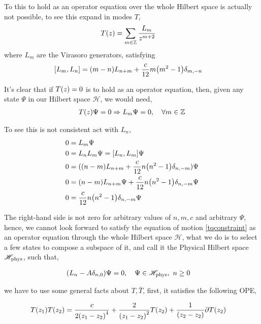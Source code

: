 To this to hold as an operator equation over the whole Hilbert space is actually not possible, to see this expand in modes $T$, 
\begin{align*}
    T\qty(z)&=\sum\limits_{m\in\mathbb Z}\frac{L_m}{z^{m+2}}
\end{align*}
where $L_m$ are the Virasoro generators, satisfying 
\begin{align*}
    \comm{L_m}{L_n}&=\qty(m-n)L_{n+m}+\frac{c}{12}m\qty(m^2-1)\delta_{m,-n}
\end{align*}

It's clear that if $T\qty(z)=0$ is to hold as an operator equation, then, given any state $\Psi$ in our Hilbert space $\mathscr H$, we would need,
\begin{align*}
    T\qty(z)\Psi=0\Rightarrow L_m\Psi=0,\ \ \ \forall m\in\mathbb Z
\end{align*}

To see this is not consistent act with $L_n$,
\begin{align*}
    0&=L_m\Psi\\
    0&=L_nL_m\Psi=\comm{L_n}{L_m}\Psi\\
    0&=(\qty(n-m)L_{n+m}+\frac{c}{12}n\qty(n^2-1)\delta_{n,-m})\Psi\\
    0&=\qty(n-m)L_{n+m}\Psi+\frac{c}{12}n\qty(n^2-1)\delta_{n,-m}\Psi\\
    0&=\frac{c}{12}n\qty(n^2-1)\delta_{n,-m}\Psi\\
\end{align*}

The right-hand side is not zero for arbitrary values of $n,m,c$ and arbitrary $\Psi$, hence, we cannot look forward to 
satisfy the equation of motion \ref{tqconstraint} as an operator equation through the whole Hilbert space $\mathscr H$, 
what we do is to select a few states to compose a subspace of it, and call it the Physical Hilbert space $\mathscr H_{\textnormal{phys}}$, such that,

\begin{align*}
    \qty(L_n-A\delta_{n,0})\Psi&=0,\ \ \ \Psi\in\mathscr H_{\textnormal{phys}},\ n\geq0
\end{align*}





we have to 
use some general facts about $T,\bar T$, first, it satisfies the following OPE,

\begin{align*}
    T\qty(z_1)T\qty(z_2)&=\frac{c}{2\qty(z_1-z_2)^4}+\frac{2}{\qty(z_1-z_2)^2}T\qty(z_2)+\frac{1}{\qty(z_2-z_2)}\partial T\qty(z_2)
\end{align*}


